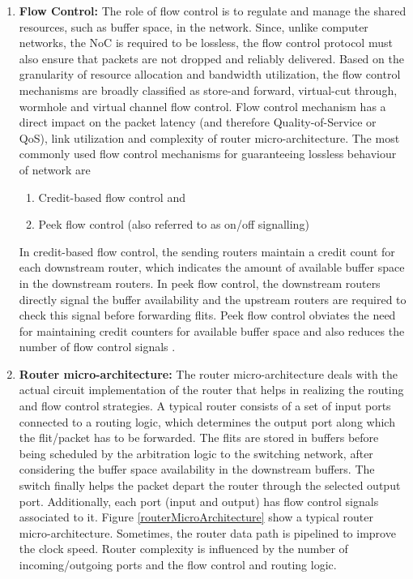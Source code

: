 \begin{enumerate}
	\item{\textbf{Flow Control:} The role of flow control is to regulate and manage the shared resources, such as buffer space, in the network. Since, unlike computer networks, the NoC is required to be lossless, the flow control protocol must also ensure that packets are not dropped and reliably delivered. Based on the granularity of resource allocation and bandwidth utilization, the flow control mechanisms are broadly classified as store-and forward, virtual-cut through, wormhole and virtual channel flow control. Flow control mechanism has a direct impact on the packet latency (and therefore Quality-of-Service or QoS), link utilization and complexity of router micro-architecture. The most commonly used flow control mechanisms for guaranteeing lossless behaviour of network are}
	\begin{enumerate} 
		\item{Credit-based flow control and}
		\item{Peek flow control (also referred to as on/off signalling)}
	\end{enumerate}
\hspace{5mm}In credit-based flow control, the sending routers maintain a credit count for each downstream router, which indicates the amount of available buffer space in the downstream routers. 
\hspace{5mm}In peek flow control, the downstream routers directly signal the buffer availability and the upstream routers are required to check this signal before forwarding flits. Peek flow control obviates the need for maintaining credit counters for available buffer space and also reduces the number of flow control signals \cite{connect_NoC}.
	\item{\textbf{Router micro-architecture:} The router micro-architecture deals with the actual circuit implementation of the router that helps in realizing the routing and flow control strategies. A typical router consists of a set of input ports connected to a routing logic, which determines the output port along which the flit/packet has to be forwarded. The flits are stored in buffers before being scheduled by the arbitration logic to the switching network, after considering the buffer space availability in the downstream buffers. The switch finally helps the packet depart the router through the selected output port. Additionally, each port (input and output) has flow control signals associated to it. Figure \ref{routerMicroArchitecture} show a typical router micro-architecture. Sometimes, the router data path is pipelined to improve the clock speed. Router complexity is influenced by the number of incoming/outgoing ports and the flow control and routing logic.}

\end{enumerate}
